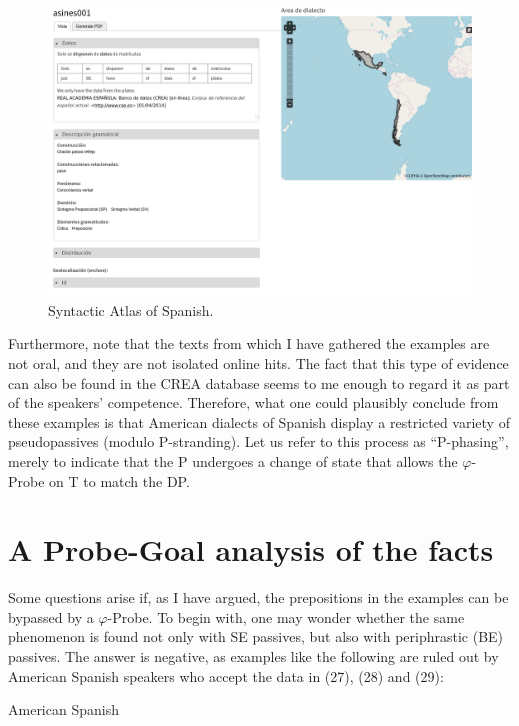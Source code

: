 \documentclass[output=paper]{langsci/langscibook}
\begin{document}
\begin{figure}\label{ex:gallego:30}\caption{Syntactic Atlas of Spanish. \citep{GallegoWebsite}}
\includegraphics[width=\textwidth]{figures/gallego-screenshot.png}
\end{figure}


Furthermore, note that the texts from which I have gathered the examples are not oral, and they are not isolated online hits. The fact that this type of evidence can also be found in the CREA database seems to me enough to regard it as part of the speakers’ competence. Therefore, what one could plausibly conclude from these examples is that American dialects of Spanish display a restricted variety of pseudopassives (modulo P-stranding). Let us refer to this process as “P-phasing”, merely to indicate that the P undergoes a change of state that allows the $\varphi ${}-Probe on T to match the DP. 

\section{A Probe-Goal analysis of the facts}%


Some questions arise if, as I have argued, the prepositions in the examples can be bypassed by a $\varphi ${}-Probe. To begin with, one may wonder whether the same phenomenon is found not only with SE passives, but also with periphrastic (BE) passives. The answer is negative, as examples like the following are ruled out by American Spanish speakers who accept the data in  (27), (28) and (29):



\ea%
    American Spanish\label{ex:gallego:31}\\
    \z
\z    
\end{document}
